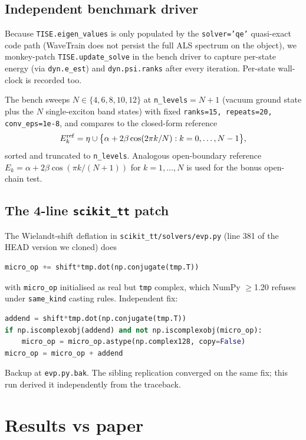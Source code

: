 \documentclass[11pt]{article}
\begin{document}
\subsection{Independent benchmark driver}
Because \texttt{TISE.eigen\_values} is only populated by the \texttt{solver='qe'}
quasi-exact code path (WaveTrain does not persist the full ALS spectrum on the
object), we monkey-patch \texttt{TISE.update\_solve} in the bench driver to
capture per-state energy (via \texttt{dyn.e\_est}) and \texttt{dyn.psi.ranks}
after every iteration.  Per-state wall-clock is recorded too.

The bench sweeps $N \in \{4,6,8,10,12\}$ at \texttt{n\_levels}${}=N+1$ (vacuum
ground state plus the $N$ single-exciton band states) with fixed
\texttt{ranks{=}15, repeats{=}20, conv\_eps{=}1e{-}8}, and compares to the
closed-form reference
\[
E_k^{\rm ref} = \eta \cup \bigl\{\alpha + 2\beta\cos(2\pi k / N) : k=0,\dots,N-1\bigr\},
\]
sorted and truncated to \texttt{n\_levels}.  Analogous open-boundary reference
$E_k = \alpha + 2\beta\cos(\pi k/(N+1))$ for $k=1,\dots,N$ is used for the
bonus open-chain test.

\subsection{The 4-line \texttt{scikit\_tt} patch}
\label{sec:patch}
The Wielandt-shift deflation in \texttt{scikit\_tt/solvers/evp.py} (line 381 of
the HEAD version we cloned) does
\begin{lstlisting}[language=Python]
micro_op += shift*tmp.dot(np.conjugate(tmp.T))
\end{lstlisting}
with \texttt{micro\_op} initialised as real but \texttt{tmp} complex, which
NumPy $\ge$1.20 refuses under \texttt{same\_kind} casting rules.  Independent
fix:
\begin{lstlisting}[language=Python]
addend = shift*tmp.dot(np.conjugate(tmp.T))
if np.iscomplexobj(addend) and not np.iscomplexobj(micro_op):
    micro_op = micro_op.astype(np.complex128, copy=False)
micro_op = micro_op + addend
\end{lstlisting}
Backup at \texttt{evp.py.bak}.  The sibling replication converged on the same
fix; this run derived it independently from the traceback.

\section{Results vs paper}
\end{document}
